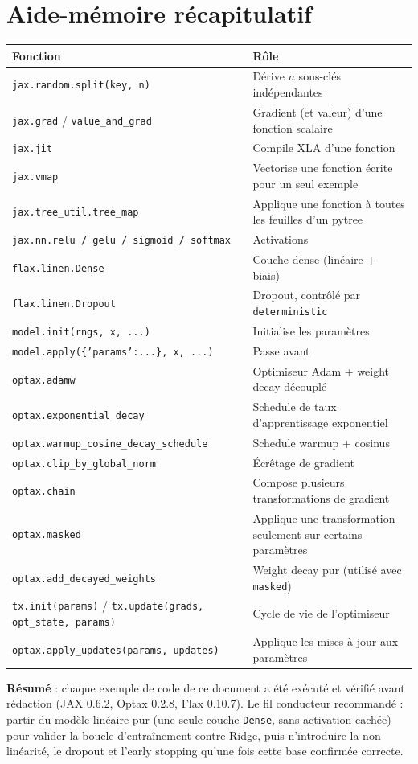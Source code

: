 \documentclass[11pt,a4paper]{article}
\begin{document}
\section{Aide-mémoire récapitulatif}

\begin{center}
\begin{tabular}{p{5cm}p{9.5cm}}
\toprule
\textbf{Fonction} & \textbf{Rôle} \\
\midrule
\texttt{jax.random.split(key, n)} & Dérive $n$ sous-clés indépendantes \\
\texttt{jax.grad} / \texttt{value\_and\_grad} & Gradient (et valeur) d'une fonction scalaire \\
\texttt{jax.jit} & Compile XLA d'une fonction \\
\texttt{jax.vmap} & Vectorise une fonction écrite pour un seul exemple \\
\texttt{jax.tree\_util.tree\_map} & Applique une fonction à toutes les feuilles d'un pytree \\
\texttt{jax.nn.relu / gelu / sigmoid / softmax} & Activations \\
\texttt{flax.linen.Dense} & Couche dense (linéaire + biais) \\
\texttt{flax.linen.Dropout} & Dropout, contrôlé par \texttt{deterministic} \\
\texttt{model.init(rngs, x, ...)} & Initialise les paramètres \\
\texttt{model.apply(\{'params':...\}, x, ...)} & Passe avant \\
\texttt{optax.adamw} & Optimiseur Adam + weight decay découplé \\
\texttt{optax.exponential\_decay} & Schedule de taux d'apprentissage exponentiel \\
\texttt{optax.warmup\_cosine\_decay\_schedule} & Schedule warmup + cosinus \\
\texttt{optax.clip\_by\_global\_norm} & Écrêtage de gradient \\
\texttt{optax.chain} & Compose plusieurs transformations de gradient \\
\texttt{optax.masked} & Applique une transformation seulement sur certains paramètres \\
\texttt{optax.add\_decayed\_weights} & Weight decay pur (utilisé avec \texttt{masked}) \\
\texttt{tx.init(params)} / \texttt{tx.update(grads, opt\_state, params)} & Cycle de vie de l'optimiseur \\
\texttt{optax.apply\_updates(params, updates)} & Applique les mises à jour aux paramètres \\
\bottomrule
\end{tabular}
\end{center}

\begin{mdframed}
\textbf{Résumé} : chaque exemple de code de ce document a été exécuté et
vérifié avant rédaction (JAX 0.6.2, Optax 0.2.8, Flax 0.10.7). Le fil
conducteur recommandé : partir du modèle linéaire pur (une seule couche
\texttt{Dense}, sans activation cachée) pour valider la boucle
d'entraînement contre Ridge, puis n'introduire la non-linéarité, le dropout
et l'early stopping qu'une fois cette base confirmée correcte.
\end{mdframed}
\end{document}
